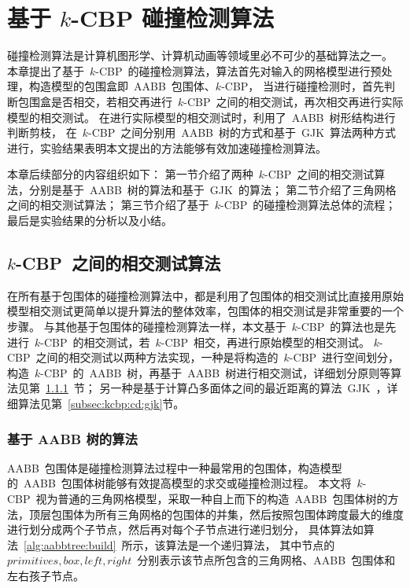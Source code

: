 

\chapter{基于 $k$-CBP 碰撞检测算法}
\label{cha:kcbp-collision-detection}

碰撞检测算法是计算机图形学、计算机动画等领域里必不可少的基础算法之一。
本章提出了基于~$k$-CBP~的碰撞检测算法，算法首先对输入的网格模型进行预处理，构造模型的包围盒即~AABB~包围体、$k$-CBP，
当进行碰撞检测时，首先判断包围盒是否相交，若相交再进行~$k$-CBP~之间的相交测试，再次相交再进行实际模型的相交测试。
在进行实际模型的相交测试时，利用了~AABB~树形结构进行判断剪枝，
在~$k$-CBP~之间分别用~AABB~树的方式和基于~GJK~算法两种方式进行，实验结果表明本文提出的方法能够有效加速碰撞检测算法。

本章后续部分的内容组织如下：
第一节介绍了两种~$k$-CBP~之间的相交测试算法，分别是基于~AABB~树的算法和基于~GJK~的算法；
第二节介绍了三角网格之间的相交测试算法；
第三节介绍了基于~$k$-CBP~的碰撞检测算法总体的流程；
最后是实验结果的分析以及小结。

\section{$k$-CBP~之间的相交测试算法}
\label{sec:kcbp:cd}

在所有基于包围体的碰撞检测算法中，都是利用了包围体的相交测试比直接用原始模型相交测试更简单以提升算法的整体效率，包围体的相交测试是非常重要的一个步骤。
与其他基于包围体的碰撞检测算法一样，本文基于~$k$-CBP~的算法也是先进行~$k$-CBP~的相交测试，若~$k$-CBP~相交，再进行原始模型的相交测试。
$k$-CBP~之间的相交测试以两种方法实现，一种是将构造的~$k$-CBP~进行空间划分，构造~$k$-CBP~的~AABB~树，再基于~AABB~树进行相交测试，详细划分原则等算法见第~\ref{subsec:kcbp:cd:aabb}~节；
另一种是基于计算凸多面体之间的最近距离的算法~GJK~，详细算法见第~\ref{subsec:kcbp:cd:gjk}节。

\subsection{基于 AABB 树的算法}
\label{subsec:kcbp:cd:aabb}

AABB~包围体是碰撞检测算法过程中一种最常用的包围体，构造模型的~AABB~包围体树能够有效提高模型的求交或碰撞检测过程。
本文将~$k$-CBP~视为普通的三角网格模型，采取一种自上而下的构造~AABB~包围体树的方法，顶层包围体为所有三角网格的包围体的并集，然后按照包围体跨度最大的维度进行划分成两个子节点，然后再对每个子节点进行递归划分，
具体算法如算法~\ref{alg:aabbtree:build}~所示，该算法是一个递归算法，%
其中节点的~$primitives,box,left,right$~分别表示该节点所包含的三角网格、AABB~包围体和左右孩子节点。

